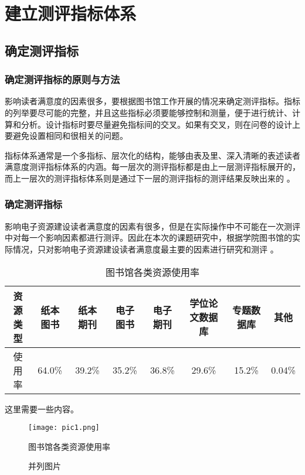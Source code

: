\section{建立测评指标体系}
    \subsection{确定测评指标}
        \subsubsection{确定测评指标的原则与方法}
            影响读者满意度的因素很多，要根据图书馆工作开展的情况来确定测评指标。指标的列举要尽可能的完整，并且这些指标必须要能够控制和测量，便于进行统计、计算和分析。设计指标时要尽量避免指标间的交叉。如果有交叉，则在问卷的设计上要避免设置相同和很相关的问题。

            指标体系通常是一个多指标、层次化的结构，能够由表及里、深入清晰的表述读者满意度测评指标体系的内涵。每一层次的测评指标都是由上一层测评指标展开的，而上一层次的测评指标体系则是通过下一层的测评指标的测评结果反映出来的 。
        \subsubsection{确定测评指标}
            影响电子资源建设读者满意度的因素有很多，但是在实际操作中不可能在一次测评中对每一个影响因素都进行测评。因此在本次的课题研究中，根据学院图书馆的实际情况，只对影响电子资源建设读者满意度最主要的因素进行研究和测评 。

            \begin{table}[h]
                \caption{图书馆各类资源使用率}
                \begin{tabular}{|c|c|c|c|c|c|c|c|}
                    \hline 
                    资源类型 & 纸本图书 & 纸本期刊 & 电子图书 & 电子期刊 & 学位论文数据库 & 专题数据库 & 其他 \\
                    \hline
                    使用率 & 64.0\% & 39.2\% & 35.2\% & 36.8\% & 29.6\% & 15.2\% & 0.04\% \\
                    \hline
                \end{tabular}
            \end{table}

            这里需要一些内容。
            
            \begin{figure}[h]
                \texttt{[image: pic1.png]}
                \caption{图书馆各类资源使用率}
            \end{figure}
            
            \begin{figure}[h]
                \caption{并列图片}
            \end{figure}